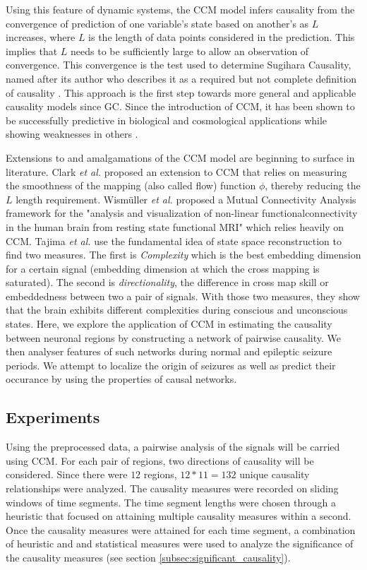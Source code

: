 \documentclass[journal,12pt,onecolumn,draftclsnofoot]{IEEEtran}  %
\begin{document}
Using this feature of dynamic systems, the CCM model infers causality from the convergence of prediction of one variable's state based on another's as $L$ increases, where $L$ is the length of data points considered in the prediction. This implies that $L$ needs to be sufficiently large to allow an observation of convergence. This convergence is the test used to determine Sugihara Causality, named after its author who describes it as a required but not complete definition of causality \cite{Sugihara2012}. This approach is the first step towards more general and applicable causality models since GC. Since the introduction of CCM, it has been shown to be successfully predictive in biological \cite{Deyle16042013,Wang2014,Sugihara2012,Mcbride2015,Nes2015} and cosmological \cite{Tsonis2015} applications while showing weaknesses in others \cite{Mccracken2014}. 

Extensions to and amalgamations of the CCM model are beginning to surface in literature. Clark \textit{et al.} proposed an extension to CCM that relies on measuring the smoothness of the mapping (also called flow) function $\phi$, thereby reducing the $L$ length requirement\cite{Clark2015}.  Wismüller \textit{et al.} proposed a Mutual Connectivity Analysis framework for the "analysis and visualization of non-linear functionalconnectivity in the human brain from resting state functional MRI" \cite{wismuller2014} which relies heavily on CCM. Tajima \textit{\textit{et al.}} use the fundamental idea of state space reconstruction to find two measures. The first is \textit{Complexity} which is the best embedding dimension for a certain signal (embedding dimension at which the cross mapping is saturated). The second is \textit{directionality}, the difference in cross map skill or embeddedness between two a pair of signals. With those two measures, they show that the brain exhibits different complexities during conscious and unconscious states. Here, we explore the application of CCM in estimating the causality between neuronal regions by constructing a network of pairwise causality. We then analyser features of such networks during normal and epileptic seizure periods. We attempt to localize the origin of seizures as well as predict their occurance by using the properties of causal networks.


\subsection{Experiments}
Using the preprocessed data, a pairwise analysis of the signals will be carried using CCM. For each pair of regions, two directions of causality will be considered. Since there were $12$ regions, $12*11=132$ unique causality relationships were analyzed. The causality measures were recorded on sliding windows of time segments. The time segment lengths were chosen through a heuristic that focused on attaining multiple causality measures within a second. Once the causality measures were attained for each time segment, a combination of heuristic and and statistical measures were used to analyze the significance of the causality measures (see section \ref{subsec:significant_causality}). 
\end{document}
